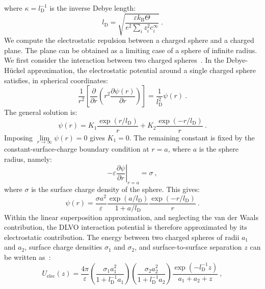 where $\kappa=l_\mathrm{D}^{-1}$ is the inverse Debye length:
\begin{equation}
l_\mathrm{D} = \sqrt{\dfrac{\varepsilon k_\mathrm{B} \Theta}{e^2 \sum_i z_i^2 c^\infty_i}}~.
\label{debye_length}
\end{equation}
We compute the electrostatic repulsion between a charged sphere and a charged plane. The plane can be obtained as a limiting case of a sphere of infinite radius. We first consider the interaction between two charged spheres~\cite{Israelachvili2011}. In the Debye-Hückel approximation, the electrostatic potential around a single charged sphere satisfies, in spherical coordinates:
\begin{equation}
\dfrac{1}{r^2}\left[ \dfrac{\partial}{\partial r} \left( r^2 \dfrac{\partial \psi(r)}{\partial r}\right) \right] 
= \dfrac{1}{l_\mathrm{D}^2}\psi(r)~.
    \label{spherical_debye_huckel}
\end{equation}
The general solution is:
\begin{equation}
    \psi(r) = K_1 \dfrac{\exp(r/l_\mathrm{D})}{r} 
    + K_2 \dfrac{\exp(-r/l_\mathrm{D})}{r}~.
\end{equation}
Imposing $\lim\limits_{r \to \infty}\psi(r) = 0$ gives $K_1=0$. The remaining constant is fixed by the constant-surface-charge boundary condition at $r=a$, where $a$ is the sphere radius, namely:
\begin{equation}
    -\varepsilon \left.\dfrac{\partial \psi}{\partial r}\right|_{r=a}=\sigma~,
\end{equation}
where $\sigma$ is the surface charge density of the sphere. This gives:
\begin{equation}
    \psi(r) = \dfrac{\sigma a^2}{\varepsilon} 
    \dfrac{\exp(a/l_\mathrm{D})}{1 + a/l_\mathrm{D}} 
    \dfrac{\exp(-r/l_\mathrm{D})}{r}~.
\end{equation}
Within the linear superposition approximation, and neglecting the van der Waals contribution, the DLVO interaction potential is therefore approximated by its electrostatic contribution. The energy between two charged spheres of radii $a_1$ and $a_2$, surface charge densities $\sigma_1$ and $\sigma_2$, and surface-to-surface separation $z$ can be written as~\cite{Bell1970}:
\begin{equation}
 U_\mathrm{elec}(z) = \dfrac{4\pi}{\varepsilon}\left(\dfrac{\sigma_1a_1^2}{1 + l_\mathrm{D}^{-1}a_1}\right)\left(\dfrac{\sigma_2a_2^2}{1 + l_\mathrm{D}^{-1}a_2}\right) \dfrac{\exp(-l_\mathrm{D}^{-1}z)}{a_1 + a_2 + z}~,
\end{equation}
